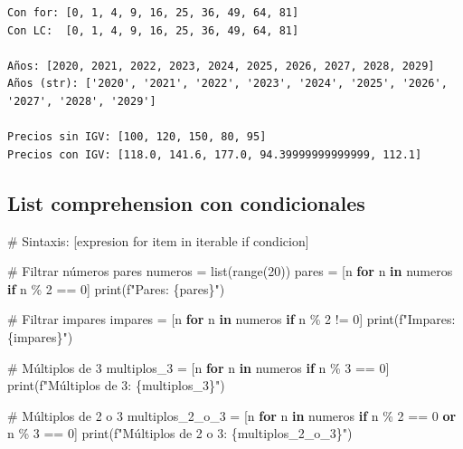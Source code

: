 \documentclass[
  doc,
  floatsintext,
  longtable,
  a4paper,
  nolmodern,
  notxfonts,
  notimes,
  12pt,
  colorlinks=true,linkcolor=blue,citecolor=blue,urlcolor=blue]{apa7}
\newenvironment{Shaded}{\begin{snugshade}}{\end{snugshade}}
\newcommand{\BuiltInTok}[1]{\textcolor[rgb]{0.00,0.23,0.31}{#1}}
\newcommand{\CommentTok}[1]{\textcolor[rgb]{0.37,0.37,0.37}{#1}}
\newcommand{\ControlFlowTok}[1]{\textcolor[rgb]{0.00,0.23,0.31}{\textbf{#1}}}
\newcommand{\DecValTok}[1]{\textcolor[rgb]{0.68,0.00,0.00}{#1}}
\newcommand{\KeywordTok}[1]{\textcolor[rgb]{0.00,0.23,0.31}{\textbf{#1}}}
\newcommand{\NormalTok}[1]{\textcolor[rgb]{0.00,0.23,0.31}{#1}}
\newcommand{\OperatorTok}[1]{\textcolor[rgb]{0.37,0.37,0.37}{#1}}
\newcommand{\SpecialCharTok}[1]{\textcolor[rgb]{0.37,0.37,0.37}{#1}}
\newcommand{\SpecialStringTok}[1]{\textcolor[rgb]{0.13,0.47,0.30}{#1}}
\begin{document}
\begin{verbatim}
Con for: [0, 1, 4, 9, 16, 25, 36, 49, 64, 81]
Con LC:  [0, 1, 4, 9, 16, 25, 36, 49, 64, 81]

Años: [2020, 2021, 2022, 2023, 2024, 2025, 2026, 2027, 2028, 2029]
Años (str): ['2020', '2021', '2022', '2023', '2024', '2025', '2026', '2027', '2028', '2029']

Precios sin IGV: [100, 120, 150, 80, 95]
Precios con IGV: [118.0, 141.6, 177.0, 94.39999999999999, 112.1]
\end{verbatim}

\subsection{List comprehension con
condicionales}\label{list-comprehension-con-condicionales}

\begin{Shaded}
\begin{Highlighting}[]
\CommentTok{\# Sintaxis: [expresion for item in iterable if condicion]}

\CommentTok{\# Filtrar números pares}
\NormalTok{numeros }\OperatorTok{=} \BuiltInTok{list}\NormalTok{(}\BuiltInTok{range}\NormalTok{(}\DecValTok{20}\NormalTok{))}
\NormalTok{pares }\OperatorTok{=}\NormalTok{ [n }\ControlFlowTok{for}\NormalTok{ n }\KeywordTok{in}\NormalTok{ numeros }\ControlFlowTok{if}\NormalTok{ n }\OperatorTok{\%} \DecValTok{2} \OperatorTok{==} \DecValTok{0}\NormalTok{]}
\BuiltInTok{print}\NormalTok{(}\SpecialStringTok{f"Pares: }\SpecialCharTok{\{}\NormalTok{pares}\SpecialCharTok{\}}\SpecialStringTok{"}\NormalTok{)}

\CommentTok{\# Filtrar impares}
\NormalTok{impares }\OperatorTok{=}\NormalTok{ [n }\ControlFlowTok{for}\NormalTok{ n }\KeywordTok{in}\NormalTok{ numeros }\ControlFlowTok{if}\NormalTok{ n }\OperatorTok{\%} \DecValTok{2} \OperatorTok{!=} \DecValTok{0}\NormalTok{]}
\BuiltInTok{print}\NormalTok{(}\SpecialStringTok{f"Impares: }\SpecialCharTok{\{}\NormalTok{impares}\SpecialCharTok{\}}\SpecialStringTok{"}\NormalTok{)}

\CommentTok{\# Múltiplos de 3}
\NormalTok{multiplos\_3 }\OperatorTok{=}\NormalTok{ [n }\ControlFlowTok{for}\NormalTok{ n }\KeywordTok{in}\NormalTok{ numeros }\ControlFlowTok{if}\NormalTok{ n }\OperatorTok{\%} \DecValTok{3} \OperatorTok{==} \DecValTok{0}\NormalTok{]}
\BuiltInTok{print}\NormalTok{(}\SpecialStringTok{f"Múltiplos de 3: }\SpecialCharTok{\{}\NormalTok{multiplos\_3}\SpecialCharTok{\}}\SpecialStringTok{"}\NormalTok{)}

\CommentTok{\# Múltiplos de 2 o 3}
\NormalTok{multiplos\_2\_o\_3 }\OperatorTok{=}\NormalTok{ [n }\ControlFlowTok{for}\NormalTok{ n }\KeywordTok{in}\NormalTok{ numeros }\ControlFlowTok{if}\NormalTok{ n }\OperatorTok{\%} \DecValTok{2} \OperatorTok{==} \DecValTok{0} \KeywordTok{or}\NormalTok{ n }\OperatorTok{\%} \DecValTok{3} \OperatorTok{==} \DecValTok{0}\NormalTok{]}
\BuiltInTok{print}\NormalTok{(}\SpecialStringTok{f"Múltiplos de 2 o 3: }\SpecialCharTok{\{}\NormalTok{multiplos\_2\_o\_3}\SpecialCharTok{\}}\SpecialStringTok{"}\NormalTok{)}
\end{Highlighting}
\end{Shaded}
\end{document}

